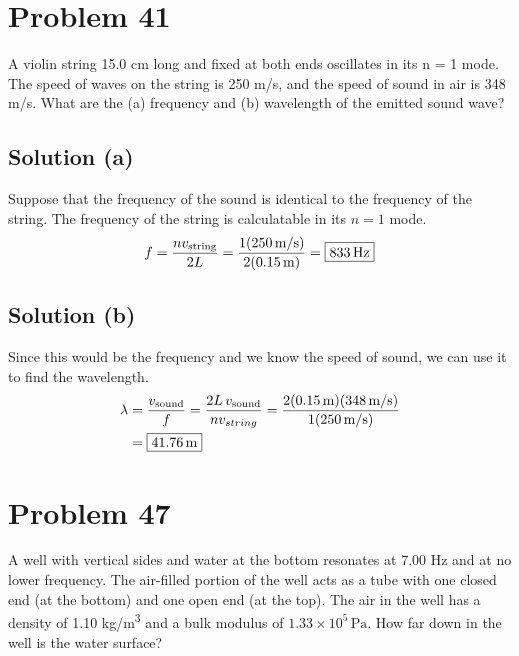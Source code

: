 \documentclass[12pt]{article}
\newcommand{\E}[1]{\times 10^{#1}}
\begin{document}
    \pagebreak
    \section{Problem 41}
        A violin string 15.0 cm long and fixed at both ends oscillates in its n = 1 mode. 
        The speed of waves on the string is 250 m/s, and the speed of sound in air is 348 m/s. 
        What are the (a) frequency and (b) wavelength of the emitted sound wave?

        \subsection{Solution (a)}
            Suppose that the frequency of the sound is identical to the frequency of the string.
            The frequency of the string is calculatable in its $n = 1$ mode.
            \begin{equation}
                f   =   \frac{nv_{\rm string}}{2L}
                    =   \frac{1(250\,\unit{\meter/\second})}{2(0.15\,\unit{\meter})}
                    =   \boxed{833\,\unit{\hertz}}
            \end{equation}

        \subsection{Solution (b)}
            Since this would be the frequency and we know the speed of sound, we can use it to find the wavelength.
            \begin{align}
                \lambda &=  \frac{v_{\rm sound}}{f}
                    =   \frac{2L\,v_{\rm sound}}{nv_{string}}
                    =   \frac{2(0.15\,\unit{\meter})(348\,\unit{\meter/\second})}{1(250\,\unit{\meter/\second})}\\
                    &=  \boxed{41.76\,\unit{\meter}}
            \end{align}

    \pagebreak
    \section{Problem 47}
        A well with vertical sides and water at the bottom resonates at 7.00 Hz and at no lower frequency. 
        The air-filled portion of the well acts as a tube with one closed end (at the bottom) and one open end (at the top). 
        The air in the well has a density of 1.10 \unit{\kilo\gram/\meter^3} and a bulk modulus of $1.33\E{5}\,\unit{\pascal}$. 
        How far down in the well is the water surface?
\end{document}
